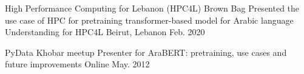 

\begin{cvhonors}


  \cvhonor
    {High Performance Computing for Lebanon (HPC4L) Brown Bag} %
    {Presented the use case of HPC for pretraining transformer-based model for Arabic language Understanding for HPC4L} %
    {Beirut, Lebanon} %
    {Feb. 2020} %


  \cvhonor
    {PyData Khobar meetup} %
    {Presenter for AraBERT: pretraining, use cases and future improvements} %
    {Online} %
    {May. 2012} %


\end{cvhonors}
